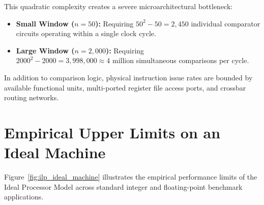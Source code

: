 This quadratic complexity creates a severe microarchitectural bottleneck:
\begin{itemize}
    \item \textbf{Small Window ($n = 50$):} Requiring $50^2 - 50 = 2{,}450$ individual comparator circuits operating within a single clock cycle.
    \item \textbf{Large Window ($n = 2{,}000$):} Requiring $2000^2 - 2000 = 3{,}998{,}000 \approx 4\text{ million}$ simultaneous comparisons per cycle.
\end{itemize}

In addition to comparison logic, physical instruction issue rates are bounded by available functional units, multi-ported register file access ports, and crossbar routing networks.

\section{Empirical Upper Limits on an Ideal Machine}
\label{sec:empirical_ideal_limits}

Figure~\ref{fig:ilp_ideal_machine} illustrates the empirical performance limits of the Ideal Processor Model across standard integer and floating-point benchmark applications.

